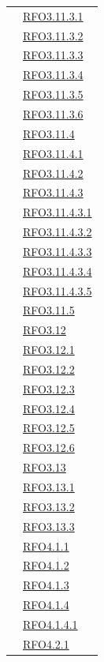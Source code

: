 \begin{longtable}{|>{\centering}m{5cm}|m{5cm}<{\centering}|}
& \hyperlink{RFO3.11.3.1}{RFO3.11.3.1}\\
& \hyperlink{RFO3.11.3.2}{RFO3.11.3.2}\\
& \hyperlink{RFO3.11.3.3}{RFO3.11.3.3}\\
& \hyperlink{RFO3.11.3.4}{RFO3.11.3.4}\\
& \hyperlink{RFO3.11.3.5}{RFO3.11.3.5}\\
& \hyperlink{RFO3.11.3.6}{RFO3.11.3.6}\\
& \hyperlink{RFO3.11.4}{RFO3.11.4}\\
& \hyperlink{RFO3.11.4.1}{RFO3.11.4.1}\\
& \hyperlink{RFO3.11.4.2}{RFO3.11.4.2}\\
& \hyperlink{RFO3.11.4.3}{RFO3.11.4.3}\\
& \hyperlink{RFO3.11.4.3.1}{RFO3.11.4.3.1}\\
& \hyperlink{RFO3.11.4.3.2}{RFO3.11.4.3.2}\\
& \hyperlink{RFO3.11.4.3.3}{RFO3.11.4.3.3}\\
& \hyperlink{RFO3.11.4.3.4}{RFO3.11.4.3.4}\\
& \hyperlink{RFO3.11.4.3.5}{RFO3.11.4.3.5}\\
& \hyperlink{RFO3.11.5}{RFO3.11.5}\\
& \hyperlink{RFO3.12}{RFO3.12}\\
& \hyperlink{RFO3.12.1}{RFO3.12.1}\\
& \hyperlink{RFO3.12.2}{RFO3.12.2}\\
& \hyperlink{RFO3.12.3}{RFO3.12.3}\\
& \hyperlink{RFO3.12.4}{RFO3.12.4}\\
& \hyperlink{RFO3.12.5}{RFO3.12.5}\\
& \hyperlink{RFO3.12.6}{RFO3.12.6}\\
& \hyperlink{RFO3.13}{RFO3.13}\\
& \hyperlink{RFO3.13.1}{RFO3.13.1}\\
& \hyperlink{RFO3.13.2}{RFO3.13.2}\\
& \hyperlink{RFO3.13.3}{RFO3.13.3}\\
& \hyperlink{RFO4.1.1}{RFO4.1.1}\\
& \hyperlink{RFO4.1.2}{RFO4.1.2}\\
& \hyperlink{RFO4.1.3}{RFO4.1.3}\\
& \hyperlink{RFO4.1.4}{RFO4.1.4}\\
& \hyperlink{RFO4.1.4.1}{RFO4.1.4.1}\\
& \hyperlink{RFO4.2.1}{RFO4.2.1}\\

\end{longtable}
